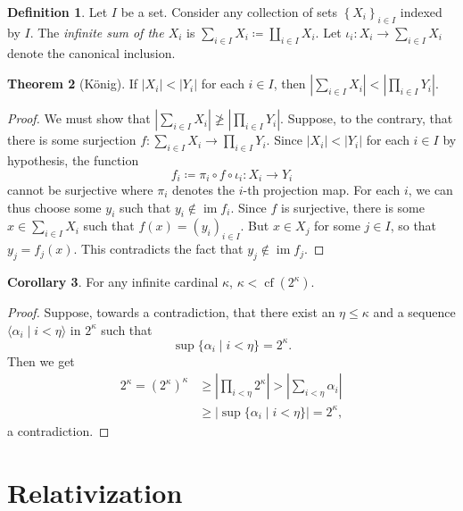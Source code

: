 \documentclass[10pt,letterpaper,cm]{nupset}
\theoremstyle{definition}
\newtheorem{definition}{Definition}[subsection]
\theoremstyle{theorem}
\newtheorem{theorem}[definition]{Theorem}
\newtheorem{corollary}[definition]{Corollary}
\theoremstyle{remark}
\newcommand{\1}{\mathbf{1}}
\newcommand{\0}{\vec 0}
\DeclareMathOperator{\im}{im}
\DeclareMathOperator{\cf}{cf}
\begin{document}
\begin{definition} Let $I$ be a set. Consider any collection of sets $\left\{X_i\right\}_{i\in I}$ indexed by $I$.
The \textit{infinite sum of the $X_i$} is $\sum_{i\in I} X_i \coloneqq \coprod_{i\in I} X_i$. Let $\iota_i : X_i \to \sum_{i\in I} X_i $ denote the canonical inclusion. 
\end{definition}

\begin{theorem}[K\"onig]
If $\left\lvert{X_i}\right\rvert < \left\lvert{Y_i}\right\rvert$ for each $i \in I$, then $\left\lvert{\sum_{i\in I} X_i}\right\rvert < \left\lvert{\prod_{i\in I} Y_i}\right\rvert$.
\end{theorem}
\begin{proof}
We must show that $\left\lvert{\sum_{i\in I} X_i}\right\rvert \not \geq \left\lvert{\prod_{i\in I} Y_i}\right\rvert$. Suppose, to the contrary, that there is some surjection $f: \sum_{i\in I} X_i \to \prod_{i\in I} Y_i$. Since $\left\lvert{X_i}\right\rvert < \left\lvert{Y_i}\right\rvert$ for each $i\in I$ by hypothesis, the function $$f_i \coloneqq \pi_i \circ f \circ \iota_i: X_i \to Y_i$$ cannot be surjective where $\pi_i$ denotes the $i$-th projection map. For each $i$, we can thus choose some $y_i$ such that $y_i \notin \im{f_i}$. Since $f$ is surjective, there is some $x\in \sum_{i\in I} X_i $ such that $f(x) = \left(y_i\right)_{i\in I}$. But $x\in X_j$ for some $j\in I$, so that $y_j = f_j(x)$. This contradicts the fact that $y_j \notin \im{f_j}$. 
\end{proof}

\begin{corollary}
For any infinite cardinal $\kappa$, $\kappa< \cf(2^{\kappa})$.
\end{corollary}
\begin{proof}
Suppose, towards a contradiction, that there exist an $\eta \leq \kappa$ and a  sequence $\langle \alpha_i \mid i < \eta \rangle$ in $2^{\kappa}$ such that $$ \sup\{\alpha_i \mid i <\eta\} = 2^{\kappa}.$$ Then we get 
\begin{align*}    
2^{\kappa}  = \left(2^{\kappa}\right)^{\kappa} 
&  \geq  \left\lvert{ \prod_{i < \eta} 2^{\kappa}}\right\rvert 
> \left\lvert{\sum_{i < \eta} \alpha_i}\right\rvert
\\ & \geq \left\lvert{\sup\{\alpha_i \mid i <\eta\}}\right\rvert 
= 2^{\kappa}
,
\end{align*}  a contradiction. 
\end{proof}

\section{Relativization}
\end{document}
